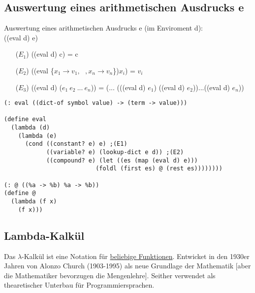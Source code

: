 \documentclass[a4paper,12pt]{article}
\begin{document}
\subsection{Auswertung eines arithmetischen Ausdrucks e}
Auswertung eines arithmetischen Ausdrucks e (im Enviroment d):\\
 ((eval d) e)
\begin{itemize}
\item[($E_1$)] ((eval d) c) = c %
\item[($E_2$)] ((eval \{$x_1\rightarrow v_1, \ \ \ ,x_n \rightarrow v_n$\})$x_i$) = $v_i$ %
\item[($E_3$)] ((eval d) ($e_1 \ e_2 \ ... \ e_n$)) = (... (((eval d) $e_1$) ((eval d) $e_2$))...((eval d) $e_n$))
\end{itemize}
\begin{lstlisting}[style=customc]
(: eval ((dict-of symbol value) -> (term -> value)))

(define eval
  (lambda (d)
    (lambda (e)
      (cond ((constant? e) e) ;(E1)
            ((variable? e) (lookup-dict e d)) ;(E2)
            ((compound? e) (let ((es (map (eval d) e)))
                          (foldl (first es) @ (rest es))))))))
      
(: @ ((%a -> %b) %a -> %b))                   
(define @
  (lambda (f x)
    (f x)))
\end{lstlisting}
\subsection{Lambda-Kalkül}
Das $\lambda$-Kalkül ist eine Notation für \uline{beliebige Funktionen}. Entwicket in den  1930er Jahren von Alonzo Church (1903-1995) als neue Grundlage der Mathematik [aber die Mathematiker bevorzugen die Mengenlehre]. Seither verwendet als thearetischer Unterbau für Programmiersprachen.
\end{document}
